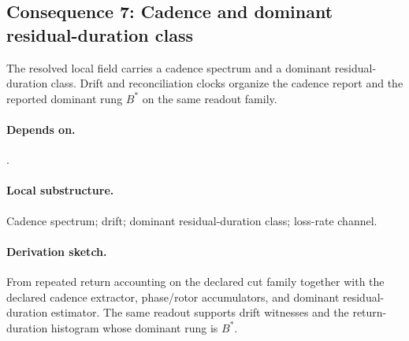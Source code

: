 \subsection{Consequence 7: Cadence and dominant residual-duration class}
\begin{consequence}\label{cons:c7}
The resolved local field carries a cadence spectrum and a dominant residual-duration class. Drift and reconciliation clocks organize the cadence report and the reported dominant rung $B^*$ on the same readout family.
\end{consequence}
\paragraph{Depends on.} .
\paragraph{Local substructure.} Cadence spectrum; drift; dominant residual-duration class; loss-rate channel.
\paragraph{Derivation sketch.} From repeated return accounting on the declared cut family together with the declared cadence extractor, phase/rotor accumulators, and dominant residual-duration estimator. The same readout supports drift witnesses and the return-duration histogram whose dominant rung is $B^*$.
